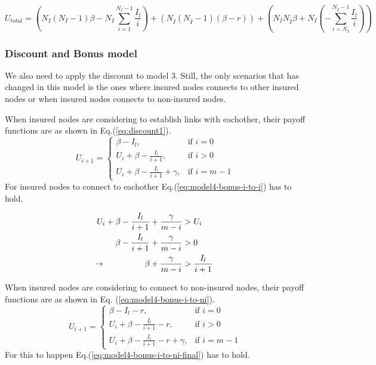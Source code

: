 \begin{equation}
U_{total}=(N_{I}(N_{I}-1)\beta-N_{I} \sum_{i=1}^{N_{I}-1} \frac{I_{l}}{i})+(N_{\overline{I}}(N_{\overline{I}}-1)(\beta-r))+(N_{I}N_{\overline{I}}\beta+N_{I}(-\sum_{i=N_{I}}^{N_{\overline{I}}-1}\frac{I_{l}}{i}))
\label{eq:model4-discount-total-payoff}
\end{equation}


\subsubsection{Discount and Bonus model}
We also need to apply the discount to model 3. Still, the only scenarios that has changed in this model is the ones where insured nodes connects to other insured nodes or when insured nodes connects to non-insured nodes.

When insured nodes are considering to establish links with eachother, their payoff functions are as shown in Eq.(\ref{eq:discount1}).  
\begin{equation}
    U_{i+1}= 
\begin{cases}
    \beta - I_{l},& \text{if } i = 0\\
    U_{i}+\beta -\frac{I_{l}}{i+1},& \text{if }  i>0\\
    U_{i}+\beta -\frac{I_{l}}{i+1}+\gamma,& \text{if } i=m-1
\end{cases}
\label{eq:discount1}
\end{equation}
For insured nodes to connect to eachother Eq.(\ref{eq:model4-bonus-i-to-i}) has to hold.

\begin{eqnarray}
U_{i}+\beta-\frac{I_{l}}{i+1}+\frac{\gamma}{m-i}&>U_{i} \nonumber \\ 
\beta-\frac{I_{l}}{i+1}+\frac{\gamma}{m-i}&>0 \nonumber \\ 
\llap{$\rightarrow$\hspace{50pt}}\beta +\frac{\gamma}{m-i}&>\frac{I_{l}}{i+1}
\label{eq:model4-bonus-i-to-i}
\end{eqnarray}

When insured nodes are considering to connect to non-insured nodes, their payoff functions are as shown in Eq. (\ref{eq:model4-bonus-i-to-ni}).
\begin{equation}
U_{i+1}= 
\begin{cases}
    \beta - I_{l}-r,& \text{if } i = 0\\
    U_{i}+\beta -\frac{I_{l}}{i+1}-r,& \text{if }  i>0\\
    U_{i}+\beta -\frac{I_{l}}{i+1}-r+\gamma,& \text{if } i=m-1
\end{cases}
\label{eq:model4-bonus-i-to-ni}
\end{equation}
For this to happen Eq.(\ref{eq:model4-bonus-i-to-ni-final}) has to hold.

